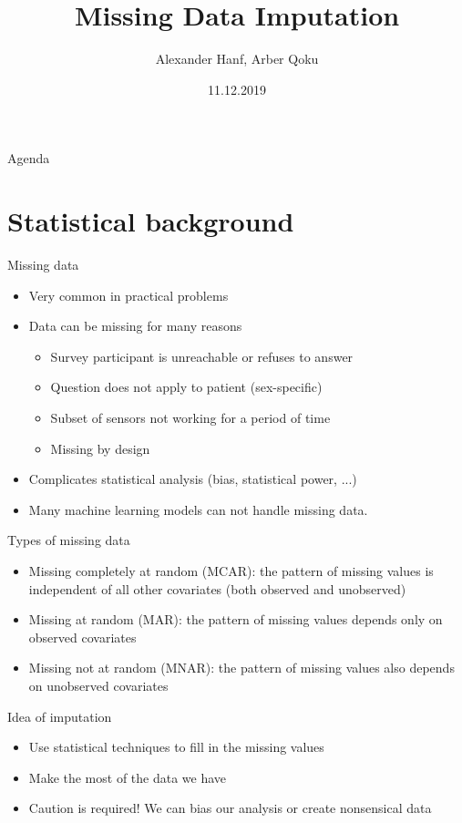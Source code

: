 \documentclass[aspectratio=43]{beamer}
\title{Missing Data Imputation}
\date{11.12.2019}
\author{Alexander Hanf, Arber Qoku}
\begin{document}
%
\maketitle

\begin{frame}{Agenda}
\tableofcontents
\end{frame}

\section{Statistical background}

\begin{frame}{Missing data}
\begin{itemize}
\item Very common in practical problems
\item Data can be missing for many reasons
\begin{itemize}
\item Survey participant is unreachable or refuses to answer
\item Question does not apply to patient (sex-specific)
\item Subset of sensors not working for a period of time
\item Missing by design
\end{itemize}
\item Complicates statistical analysis (bias, statistical power, ...)
\item Many machine learning models can not handle missing data.
\end{itemize}
\end{frame}

\begin{frame}{Types of missing data}
\begin{itemize}
\item Missing completely at random (MCAR): the pattern of missing values is independent of all other covariates (both observed and unobserved)
\item Missing at random (MAR): the pattern of missing values depends only on observed covariates
\item Missing not at random (MNAR): the pattern of missing values also depends on unobserved covariates
\end{itemize}
\end{frame}

\begin{frame}{Idea of imputation}
\begin{itemize}
\item Use statistical techniques to fill in the missing values
\item Make the most of the data we have
\item Caution is required! We can bias our analysis or create nonsensical data
\end{itemize}
\end{frame}
\end{document}

